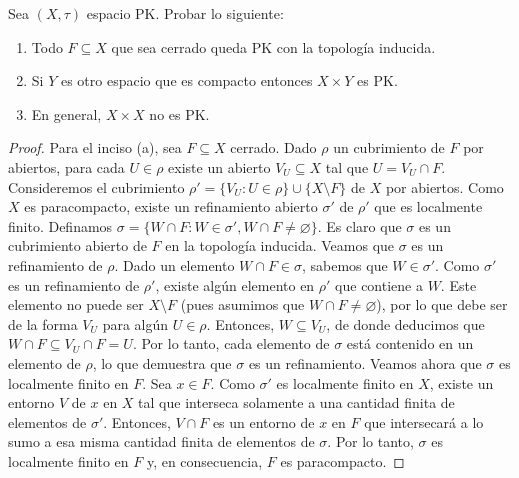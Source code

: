 \documentclass{article}
\theoremstyle{plain}
\theoremstyle{definition}
\newenvironment{ejercicio}[1]{\begin{trivlist}
\item[\hskip \labelsep {\bfseries Ejercicio}\hskip \labelsep {\bfseries #1.}]}{\end{trivlist}}
\begin{document}
\begin{ejercicio}{4}
    Sea \( (X, \tau) \) espacio PK. Probar lo siguiente:
    \begin{enumerate}
        \item[(a)] Todo \( F \subseteq X \) que sea cerrado queda PK con la topología inducida.
        \item[(b)] Si \( Y \) es otro espacio que es compacto entonces \( X \times Y \) es PK.
        \item[(c)] En general, \( X \times X \) no es PK.
    \end{enumerate}
\end{ejercicio}
\begin{proof}
    Para el inciso (a), sea \( F \subseteq X \) cerrado. Dado \( \rho \) un cubrimiento de \( F \) por abiertos, para cada \( U \in \rho \) existe un abierto \( V_U \subseteq X \) tal que \( U = V_U \cap F \).
    Consideremos el cubrimiento \( \rho' = \{ V_U : U \in \rho \} \cup \{ X \setminus F \} \) de \( X \) por abiertos. Como \( X \) es paracompacto, existe un refinamiento abierto \( \sigma' \) de \( \rho' \) que es localmente finito.
    Definamos \( \sigma = \{ W \cap F : W \in \sigma', W \cap F \neq \varnothing \} \). Es claro que \( \sigma \) es un cubrimiento abierto de \( F \) en la topología inducida. Veamos que \( \sigma \) es un refinamiento de \( \rho \). Dado un elemento \( W \cap F \in \sigma \), sabemos que \( W \in \sigma' \). Como \( \sigma' \) es un refinamiento de \( \rho' \), existe algún elemento en \( \rho' \) que contiene a \( W \). Este elemento no puede ser \( X \setminus F \) (pues asumimos que \( W \cap F \neq \varnothing \)), por lo que debe ser de la forma \( V_U \) para algún \( U \in \rho \). Entonces, \( W \subseteq V_U \), de donde deducimos que \( W \cap F \subseteq V_U \cap F = U \). Por lo tanto, cada elemento de \( \sigma \) está contenido en un elemento de \( \rho \), lo que demuestra que \( \sigma \) es un refinamiento.
    Veamos ahora que \( \sigma \) es localmente finito en \( F \). Sea \( x \in F \). Como \( \sigma' \) es localmente finito en \( X \), existe un entorno \( V \) de \( x \) en \( X \) tal que interseca solamente a una cantidad finita de elementos de \( \sigma' \). Entonces, \( V \cap F \) es un entorno de \( x \) en \( F \) que intersecará a lo sumo a esa misma cantidad finita de elementos de \( \sigma \). Por lo tanto, \( \sigma \) es localmente finito en \( F \) y, en consecuencia, \( F \) es paracompacto.


\end{proof}
\end{document}
